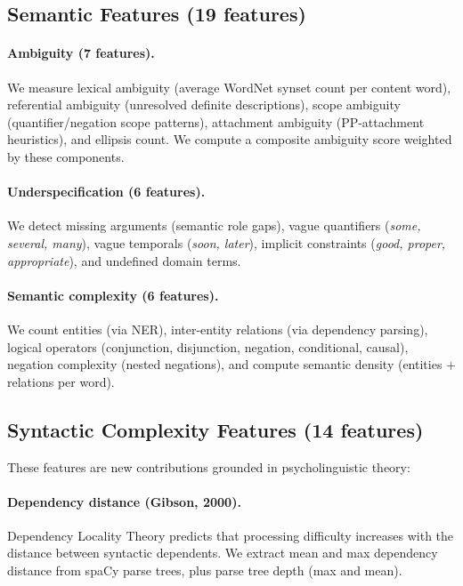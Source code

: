 \documentclass{article}
\begin{document}
\subsection{Semantic Features (19 features)}

\paragraph{Ambiguity (7 features).}
We measure lexical ambiguity (average WordNet synset count per content word), referential ambiguity (unresolved definite descriptions), scope ambiguity (quantifier/negation scope patterns), attachment ambiguity (PP-attachment heuristics), and ellipsis count. We compute a composite ambiguity score weighted by these components.

\paragraph{Underspecification (6 features).}
We detect missing arguments (semantic role gaps), vague quantifiers (\emph{some, several, many}), vague temporals (\emph{soon, later}), implicit constraints (\emph{good, proper, appropriate}), and undefined domain terms.

\paragraph{Semantic complexity (6 features).}
We count entities (via NER), inter-entity relations (via dependency parsing), logical operators (conjunction, disjunction, negation, conditional, causal), negation complexity (nested negations), and compute semantic density (entities + relations per word).

\subsection{Syntactic Complexity Features (14 features)}
\label{sec:syntactic_features}

These features are new contributions grounded in psycholinguistic theory:

\paragraph{Dependency distance (Gibson, 2000).}
Dependency Locality Theory predicts that processing difficulty increases with the distance between syntactic dependents. We extract mean and max dependency distance from spaCy parse trees, plus parse tree depth (max and mean).
\end{document}
